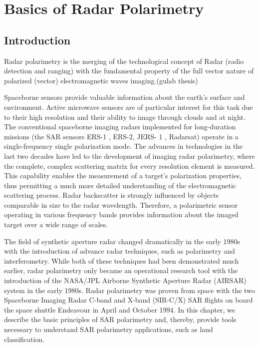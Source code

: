 \chapter{Basics of Radar Polarimetry}
\section{Introduction}

Radar polarimetry is the merging of the technological concept of Radar (radio detection and ranging) with the fundamental property of the full vector nature of polarized (vector) electromagnetic waves imaging.(gulab thesis)

Spaceborne sensors provide valuable information about the earth's surface and environment. Active microwave sensors are of particular interest for this task due to their high resolution and their ability to image through clouds and at night. The conventional spaceborne imaging radars implemented for long-duration missions (the SAR sensors ERS-1 , ERS-2, JERS- 1 , Radarsat) operate in a single-frequency single polarization mode. The advances in technologies in the last two decades have led to the development of imaging radar polarimetry, where the complete, complex scattering matrix for every resolution element is measured. This capability enables the measurement of a target's polarization properties, thus permitting a much more detailed understanding of the electromagnetic scattering process. Radar backscatter is strongly influenced by objects comparable in size to the radar wavelength. Therefore, a polarimetric sensor operating in various frequency bands provides information about the imaged target over a wide range of scales.


The field of synthetic aperture radar changed dramatically in the early 1980s with the introduction of advance radar techniques, such as polarimetry and interferometry. While both of these techniques had been demonstrated much earlier, radar polarimetry only became an operational research tool with the introduction of the NASA/JPL Airborne Synthetic Aperture Radar (AIRSAR) system in the early 1980s. Radar polarimetry was proven from space with the two Spaceborne Imaging Radar C-band and X-band (SIR-C/X) SAR flights on board the space shuttle Endeavour in April and October 1994. In this chapter, we describe the basic principles of SAR polarimetry and, thereby, provide tools necessary to understand SAR polarimetry applications, such as land classification.

